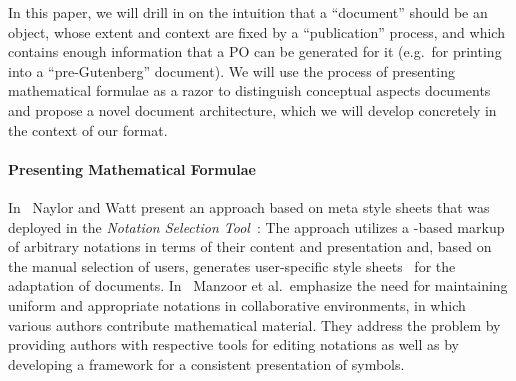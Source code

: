 \documentclass[a4paper]{article}
\begin{document}
In this paper, we will drill in on the intuition that a ``document'' should be an object,
whose extent and context are fixed by a ``publication'' process, and which contains enough
information that a PO can be generated for it (e.g.\ for printing into a ``pre-Gutenberg''
document). We will use the process of presenting mathematical formulae as a razor to
distinguish conceptual aspects documents and propose a novel document architecture, which
we will develop concretely in the context of our {\omdoc} format.


\paragraph{Presenting Mathematical Formulae} In~\cite{Naylor:conversion} Naylor and Watt
present an approach based on meta style sheets that was deployed in the \emph{Notation
  Selection Tool}~\cite{NotSelectTool:web}: The approach utilizes a {\mathml}-based markup
of arbitrary notations in terms of their content and presentation and, based on the manual
selection of users, generates user-specific {\xslt} style sheets~\cite{W3C:xslt2} for the
adaptation of documents. In~\cite{ManLib:apo05} Manzoor et al.\ emphasize the need for
maintaining uniform and appropriate notations in collaborative environments, in which
various authors contribute mathematical material. They address the problem by providing
authors with respective tools for editing notations as well as by developing a framework
for a consistent presentation of symbols.
\end{document}
